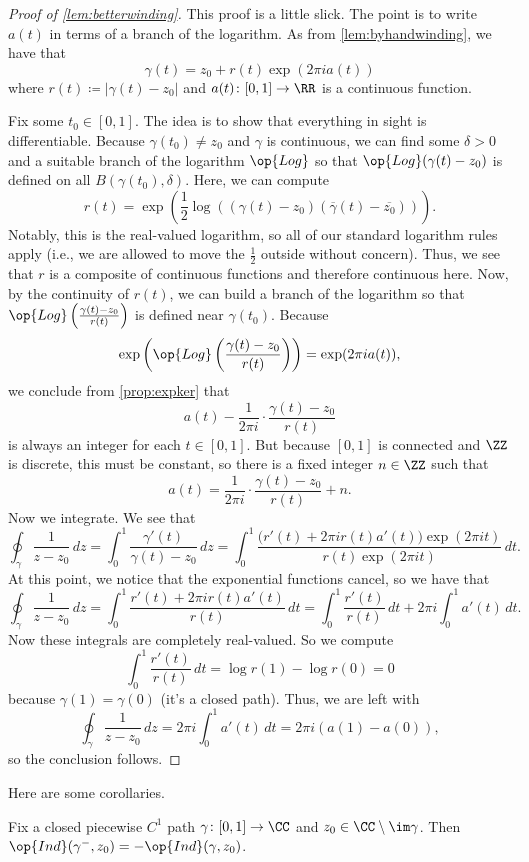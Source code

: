 \begin{proof}[Proof of \autoref{lem:betterwinding}]
	This proof is a little slick. The point is to write $a(t)$ in terms of a branch of the logarithm. As from \autoref{lem:byhandwinding}, we have that
	\[\gamma(t)=z_0+r(t)\exp(2\pi ia(t))\]
	where $r(t)\coloneqq |\gamma(t)-z_0|$ and $a(t)\colon [0,1]\to\RR$ is a continuous function.

	Fix some $t_0\in[0,1]$. The idea is to show that everything in sight is differentiable. Because $\gamma(t_0)\ne z_0$ and $\gamma$ is continuous, we can find some $\delta>0$ and a suitable branch of the logarithm $\op{Log}$ so that $\op{Log}(\gamma(t)-z_0)$ is defined on all $B(\gamma(t_0),\delta)$. Here, we can compute
	\[r(t)=\exp\left(\frac12\log\left((\gamma(t)-z_0)(\overline\gamma(t)-\overline{z_0})\right)\right).\]
	Notably, this is the real-valued logarithm, so all of our standard logarithm rules apply (i.e., we are allowed to move the $\frac12$ outside without concern). Thus, we see that $r$ is a composite of continuous functions and therefore continuous here. Now, by the continuity of $r(t)$, we can build a branch of the logarithm so that $\op{Log}\left(\frac{\gamma(t)-z_0}{r(t)}\right)$ is defined near $\gamma(t_0)$. Because
	\[\exp\left(\op{Log}\left(\frac{\gamma(t)-z_0}{r(t)}\right)\right)=\exp(2\pi ia(t)),\]
	we conclude from \autoref{prop:expker} that
	\[a(t)-\frac1{2\pi i}\cdot\frac{\gamma(t)-z_0}{r(t)}\]
	is always an integer for each $t\in[0,1]$. But because $[0,1]$ is connected and $\ZZ$ is discrete, this must be constant, so there is a fixed integer $n\in\ZZ$ such that
	\[a(t)=\frac1{2\pi i}\cdot\frac{\gamma(t)-z_0}{r(t)}+n.\]
	Now we integrate. We see that
	\[\oint_\gamma\frac1{z-z_0}\,dz=\int_0^1\frac{\gamma'(t)}{\gamma(t)-z_0}\,dz=\int_0^1\frac{\big(r'(t)+2\pi ir(t)a'(t)\big)\exp(2\pi it)}{r(t)\exp(2\pi it)}\,dt.\]
	At this point, we notice that the exponential functions cancel, so we have that
	\[\oint_\gamma\frac1{z-z_0}\,dz=\int_0^1\frac{r'(t)+2\pi ir(t)a'(t)}{r(t)}\,dt=\int_0^1\frac{r'(t)}{r(t)}\,dt+2\pi i\int_0^1a'(t)\,dt.\]
	Now these integrals are completely real-valued. So we compute
	\[\int_0^1\frac{r'(t)}{r(t)}\,dt=\log r(1)-\log r(0)=0\]
	because $\gamma(1)=\gamma(0)$ (it's a closed path). Thus, we are left with
	\[\oint_\gamma\frac1{z-z_0}\,dz=2\pi i\int_0^1a'(t)\,dt=2\pi i(a(1)-a(0)),\]
	so the conclusion follows.
\end{proof}
Here are some corollaries.
\begin{corollary}
	Fix a closed piecewise $C^1$ path $\gamma\colon [0,1]\to\CC$ and $z_0\in\CC\setminus\im\gamma$. Then $\op{Ind}(\gamma^-,z_0)=-\op{Ind}(\gamma,z_0)$.
\end{corollary}
